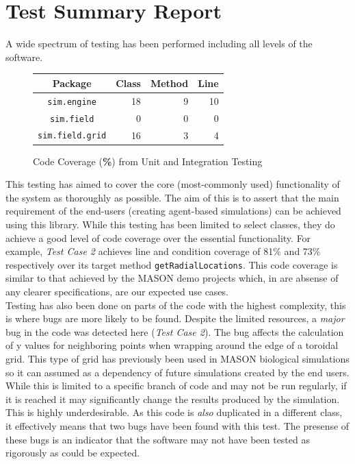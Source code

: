 \documentclass[11pt]{article}
\begin{document}
\section{Test Summary Report}%
A wide spectrum of testing has been performed including all levels of the software.
\begin{figure}
\begin{tabular}{|c|r|r|r|}
	\hline
	\textbf{Package} & \textbf{Class} & \textbf{Method} & \textbf{Line} \\
	\hline
	\texttt{sim.engine} & 18 & 9 & 10 \\
	\hline
	\texttt{sim.field} & 0 & 0 & 0 \\
	\hline
	\texttt{sim.field.grid} & 16 & 3 & 4 \\
	\hline
\end{tabular}
\caption{Code Coverage (\textbf{\%}) from Unit and Integration Testing}
\label{fig:coverage_testing}
\end{figure}
This testing has aimed to cover the core (most-commonly used) functionality of the system as thoroughly as possible.
The aim of this is to assert that the main requirement of the end-users (creating agent-based simulations) can be achieved using this library.
While this testing has been limited to select classes, they do achieve a good level of code coverage over the essential functionality.
For example, \textit{Test Case 2} achieves line and condition coverage of 81\% and 73\% respectively over its target method \texttt{getRadialLocations}.
This code coverage is similar to that achieved by the MASON demo projects which, in are absense of any clearer specifications, are our expected use cases.
\\

Testing has also been done on parts of the code with the highest complexity, this is where bugs are more likely to be found.
Despite the limited resources, a \textit{major} bug in the code was detected here (\textit{Test Case 2}).
The bug affects the calculation of y values for neighboring points when wrapping around the edge of a toroidal grid.
This type of grid has previously been used in MASON biological simulations\cite{ppsim} so it can assumed as a dependency of future simulations created by the end users.
While this is limited to a specific branch of code and may not be run regularly, if it is reached it may significantly change the results produced by the simulation.
This is highly underdesirable.
As this code is \textit{also} duplicated in a different class, it effectively means that two bugs have been found with this test.
The presense of these bugs is an indicator that the software may not have been tested as rigorously as could be expected.
\\
\end{document}
